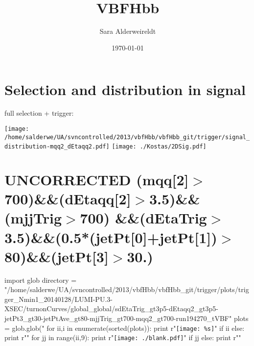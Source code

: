 \documentclass[12pt,english,dvipsnames]{beamer}
\author[S. Alderweireldt]{Sara Alderweireldt}
\date{\today}
\institute[UA]{\small Universiteit Antwerpen}
\title{VBFHbb}
\newcommand{\overlayred}[3]{\begin{tikzpicture}[overlay, remember picture]\pgftransformshift{\pgfpointanchor{current page}{center}}\node<#1$>$[overlayblockred] at #2 {#3};\end{tikzpicture}}
\newcommand{\UAoverlay}[0]{%
\begin{tikzpicture}[remember picture,overlay,shift={(current page.north east)}]
\node (zero) at (-1.8cm,-0.93cm) {\texttt{[image: ../logos/CMS.pdf]}\hspace{0.15cm}\texttt{[image: ../logos/CERN.pdf]}\hspace{0.15cm}\texttt{[image: ../logos/UA.pdf]}}; 
\end{tikzpicture}
}
\begin{document}
\section{\footnotesize Selection and distribution in signal}
\begin{frame}[t,fragile]%
\footnotesize
full selection + trigger: 

\texttt{[image: /home/salderwe/UA/svncontrolled/2013/vbfHbb/vbfHbb\_git/trigger/signal\_distribution-mqq2\_dEtaqq2.pdf]}\hfill
\texttt{[image: ./Kostas/2DSig.pdf]}

\end{frame}
\section{\tiny UNCORRECTED (mqq[2]$>$700)\&\&(dEtaqq[2]$>$3.5)\&\&(mjjTrig$>$700) \&\&(dEtaTrig$>$3.5)\&\&(0.5*(jetPt[0]+jetPt[1])$>$80)\&\&(jetPt[3]$>$30.)}
\begin{frame}[t,fragile]%
\begin{python}
import glob
directory = "/home/salderwe/UA/svncontrolled/2013/vbfHbb/vbfHbb_git/trigger/plots/trigger_Nmin1_20140128/LUMI-PU.3-XSEC/turnonCurves/global_global/sdEtaTrig_gt3p5-dEtaqq2_gt3p5-jetPt3_gt30-jetPtAve_gt80-mjjTrig_gt700-mqq2_gt700-run194270_tVBF"
plots = glob.glob("%
for ii,i in enumerate(sorted(plots)):
  print r"\texttt{[image: \%s]}"%
  if ii%
  else: print r"\hfill"
for jj in range(ii,9):
  print r"\texttt{[image: ./blank.pdf]}"
  if jj%
  else: print r"\hfill"
\end{python}

\end{frame}
\end{document}
